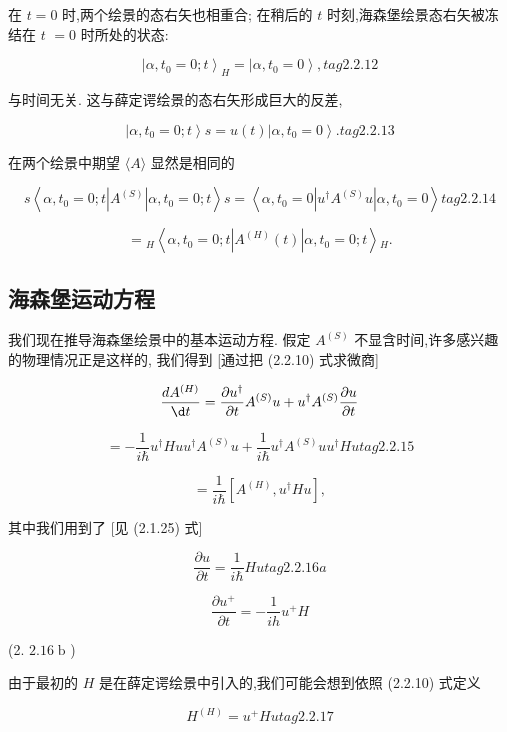 \documentclass[lang=cn,newtx,10pt,scheme=chinese,thmcnt=section]{elegantbook}
\begin{document}
在 $t = 0$ 时,两个绘景的态右矢也相重合; 在稍后的 $t$ 时刻,海森堡绘景态右矢被冻结在 $t$ $= 0$ 时所处的状态:

$$
{\left| \alpha ,{t}_{0} = 0;t\right\rangle }_{H} = \left| {\alpha ,{t}_{0} = 0}\right\rangle , tag{2.2.12}
$$

与时间无关. 这与薛定谔绘景的态右矢形成巨大的反差,

$$
\left| {\alpha ,{t}_{0} = 0;t}\right\rangle s = u\left( t\right) \left| {\alpha ,{t}_{0} = 0}\right\rangle . tag{2.2.13}
$$

在两个绘景中期望 $\langle A\rangle$ 显然是相同的

$$
s\left\langle {\alpha ,{t}_{0} = 0;t\left| {A}^{\left( S\right) }\right| \alpha ,{t}_{0} = 0;t}\right\rangle s = \left\langle {\alpha ,{t}_{0} = 0 | {u}^{ \dagger }{A}^{\left( S\right) }u | \alpha ,{t}_{0} = 0}\right\rangle tag{2.2.14}
$$

$$
= {}_{H}\left\langle {\alpha ,{t}_{0} = 0;t\left| {{A}^{\left( H\right) }\left( t\right) }\right| \alpha ,{t}_{0} = 0;t}\right\rangle {}_{H}.
$$

\subsection*{海森堡运动方程}
我们现在推导海森堡绘景中的基本运动方程. 假定 ${A}^{\left( S\right) }$ 不显含时间,许多感兴趣的物理情况正是这样的, 我们得到 [通过把 (2.2.10) 式求微商]

$$
\frac{d{A}^{\left( H\right) }}{\d t} = \frac{\partial {u}^{ \dagger }}{\partial t}{A}^{\left( S\right) }u + {u}^{ \dagger }{A}^{\left( S\right) }\frac{\partial u}{\partial t}
$$

$$
= - \frac{1}{i\hbar }{u}^{ \dagger }Hu{u}^{ \dagger }{A}^{\left( S\right) }u + \frac{1}{i\hbar }{u}^{ \dagger }{A}^{\left( S\right) }u{u}^{ \dagger }{Hu} tag{2.2.15}
$$

$$
= \frac{1}{i\hbar }\left\lbrack {{A}^{\left( H\right) },{u}^{ \dagger }{Hu}}\right\rbrack ,
$$

其中我们用到了 [见 (2.1.25) 式]

$$
\frac{\partial u}{\partial t} = \frac{1}{i\hbar }{Hu} tag{2.2.16a}
$$

$$
\frac{\partial {u}^{ + }}{\partial t} = - \frac{1}{ih}{u}^{ + }H
$$

(2. ${2.16}\mathrm{\;b}$ )

由于最初的 $H$ 是在薛定谔绘景中引入的,我们可能会想到依照 (2.2.10) 式定义

$$
{H}^{\left( H\right) } = {u}^{ + }{Hu} tag{2.2.17}
$$
\end{document}
